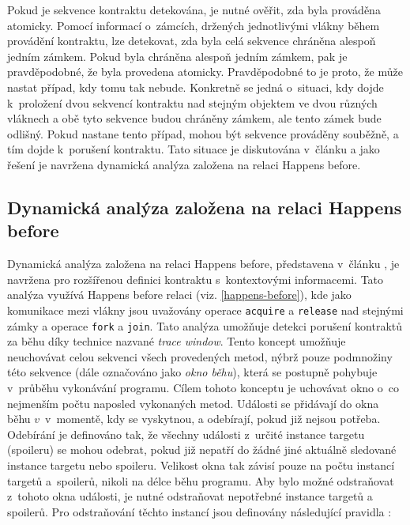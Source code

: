Pokud je sekvence kontraktu detekována, je nutné ověřit, zda byla prováděna atomicky. Pomocí informací o~zámcích, držených jednotlivými vlákny během provádění kontraktu, lze detekovat, zda byla celá sekvence chráněna alespoň jedním zámkem. Pokud byla chráněna alespoň jedním zámkem, pak je pravděpodobné, že byla provedena atomicky. Pravděpodobné to je proto, že může nastat případ, kdy tomu tak nebude. Konkretně se jedná o~situaci, kdy dojde k~proložení dvou sekvencí kontraktu nad stejným objektem ve dvou různých vláknech a obě tyto sekvence budou chráněny zámkem, ale tento zámek bude odlišný. Pokud nastane tento případ, mohou být sekvence prováděny souběžně, a tím dojde k~porušení kontraktu. Tato situace je diskutována v~článku \cite{cite:contract1} a jako řešení je navržena dynamická analýza založena na relaci Happens before.


\subsection{Dynamická analýza založena na relaci Happens before}\label{contract-hb}

Dynamická analýza založena na relaci Happens before, představena v~článku \cite{cite:contract2}, je navržena pro rozšířenou definici kontraktu s~kontextovými informacemi. Tato analýza využívá Happens before relaci (viz. \ref{happens-before}), kde jako komunikace mezi vlákny jsou uvažovány operace \texttt{acquire} a \texttt{release} nad stejnými zámky a operace \texttt{fork} a \texttt{join}. Tato analýza umožňuje detekci porušení kontraktů za běhu díky technice nazvané \textit{trace window}. Tento koncept umožňuje neuchovávat celou sekvenci všech provedených metod, nýbrž pouze podmnožiny této sekvence (dále označováno jako \textit{okno běhu}), která se postupně pohybuje v~průběhu vykonávání programu. Cílem tohoto konceptu je uchovávat okno o~co nejmenším počtu naposled vykonaných metod.
Události se přidávají do okna běhu $v$~v~momentě, kdy se vyskytnou, a odebírají, pokud již nejsou potřeba. Odebírání je definováno tak, že všechny události z~určité instance targetu (spoileru) se mohou odebrat, pokud již nepatří do žádné jiné aktuálně sledované instance targetu nebo spoileru. Velikost okna tak závisí pouze na počtu instancí targetů a~spoilerů, nikoli na délce běhu programu. Aby bylo možné odstraňovat z~tohoto okna události, je nutné odstraňovat nepotřebné instance targetů a spoilerů. Pro odstraňování těchto instancí jsou definovány následující pravidla \cite{cite:contract2}: 

